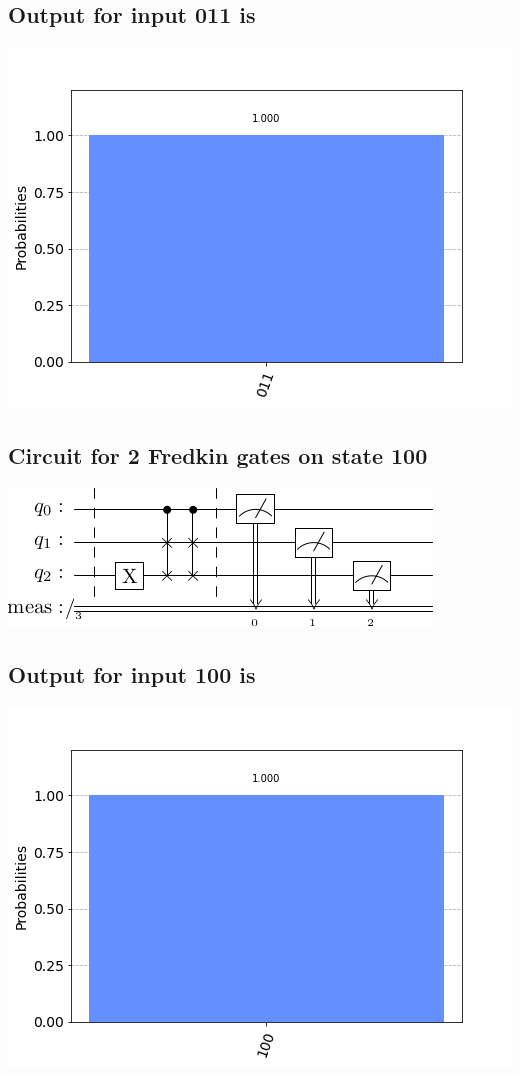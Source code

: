 \documentclass[a4paper]{article}
\begin{document}
\begin{answer}[Question 1 a]
        \subsection*{Output for input 011 is}
        \includegraphics[scale = 0.5]{1a011-out.png}
        \subsection*{Circuit for 2 Fredkin gates on state 100}
        \includegraphics[scale = 0.5]{1a100.png}
        \subsection*{Output for input 100 is}
        \includegraphics[scale = 0.5]{1a100-out.png}

\end{answer}
\end{document}
